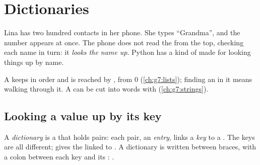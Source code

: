 \chapter{Dictionaries}\label{ch:g8:dictionaries}

Lina has two hundred contacts in her phone. She types ``Grandma'', and the
number appears at once. The phone does not read the  from the top,
checking each name in turn: it \emph{looks the name up}. Python has a kind of
 made for looking things up by name.

\begin{recall}
A  keeps  in order and is reached by , from 0
(\cref{ch:g7:lists}); finding an  in it means walking through it. A
 can be cut into words with  (\cref{ch:g7:strings}).
\end{recall}

\section{Looking a value up by its key}

\begin{definition}\label{def:g8:dictionaries:dictionary}\label{def:g8:dictionaries:key}\label{def:g8:dictionaries:entry}
A \emph{dictionary} is a  that holds pairs: each pair,
an \emph{entry}, links a \emph{key} to a
. The keys are all different;  gives the  linked to
. A dictionary is written between braces, with a colon between
each key and its : .
\end{definition}

\label{lst:g8:dictionaries:contacts}

\label{out:g8:dictionaries:contacts}

